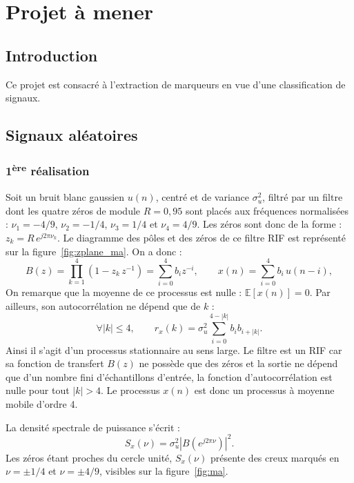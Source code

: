 \documentclass[11pt,a4paper]{article}
\begin{document}
\section{Projet à mener}

\subsection{Introduction}
Ce projet est consacré à l'extraction de marqueurs en vue d'une classification de signaux.

\subsection{Signaux aléatoires}
\subsubsection{1\textsuperscript{ère} réalisation}
Soit un bruit blanc gaussien $u(n)$, centré et de variance $\sigma_u^2$, filtré par un filtre dont les quatre zéros de module $R = 0{,}95$ sont placés aux fréquences normalisées : $\nu_1 = -4/9$, $\nu_2 = -1/4$, $\nu_3 = 1/4$ et $\nu_4 = 4/9$. Les zéros sont donc de la forme : $z_k = R\, e^{j2\pi\nu_k}$. Le diagramme des pôles et des zéros de ce filtre RIF est représenté sur la figure~\ref{fig:zplane_ma}. On a donc :
\begin{equation}
  B(z) = \prod_{k=1}^{4} \left( 1 - z_k\, z^{-1} \right)
       = \sum_{i=0}^{4} b_i z^{-i},
  \qquad
  x(n) = \sum_{i=0}^{4} b_i\, u(n-i),
  \label{eq:ma4}
\end{equation}
On remarque que la moyenne de ce processus est nulle : $\mathbb{E}[x(n)] = 0$. Par ailleurs, son autocorrélation ne dépend que de $k$ :
\begin{equation}
    \forall |k| \leq 4,
    \qquad
    r_x(k) = \sigma_u^2 \sum_{i=0}^{4-|k|} b_i b_{i+|k|}.
    \label{eq:r_x}
\end{equation}
Ainsi il s'agit d'un processus stationnaire au sens large. Le filtre est un RIF car sa fonction de transfert
$B(z)$ ne possède que des zéros et la sortie ne dépend que d'un nombre fini
d'échantillons d'entrée, la fonction d'autocorrélation
est nulle pour tout $|k| > 4$. Le processus $x(n)$ est donc un processus à moyenne mobile d'ordre 4.

La densité spectrale de puissance s'écrit :
\begin{equation}
  S_x(\nu) = \sigma_u^2 \left| B\!\left(e^{j2\pi\nu}\right) \right|^2.
  \label{eq:dsp_ma}
\end{equation}
Les zéros étant proches du cercle unité, $S_x(\nu)$ présente des creux marqués en
$\nu = \pm 1/4$ et $\nu = \pm 4/9$, visibles sur la figure~\ref{fig:ma}.
\end{document}

